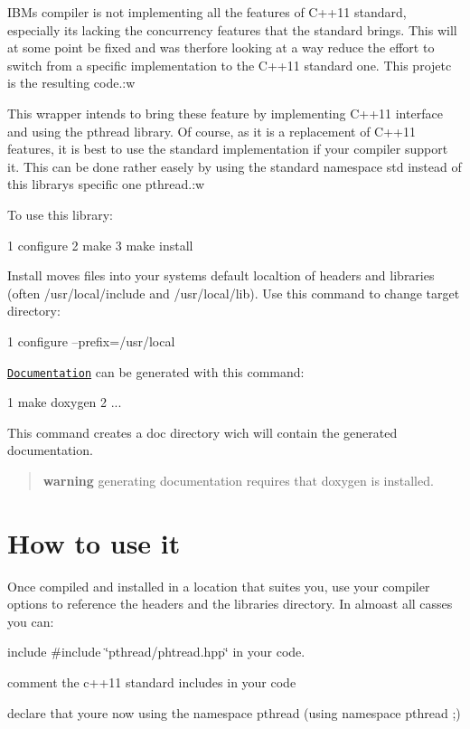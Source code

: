 I\+BM\textquotesingle{}s compiler is not implementing all the features of C++11 standard, especially it\textquotesingle{}s lacking the concurrency features that the standard brings. This will at some point be fixed and was therfore looking at a way reduce the effort to switch from a specific implementation to the C++11 standard one. This projetc is the resulting code.\+:w

This wrapper intends to bring these feature by implementing C++11 interface and using the pthread library. Of course, as it is a replacement of C++11 features, it is best to use the standard implementation if your compiler support it. This can be done rather easely by using the standard namespace {\ttfamily std} instead of this library\textquotesingle{}s specific one {\ttfamily pthread}.\+:w

To use this library\+: 
\begin{DoxyCode}
1 configure
2 make
3 make install
\end{DoxyCode}


Install moves files into your system\textquotesingle{}s default localtion of headers and libraries (often /usr/local/include and /usr/local/lib). Use this command to change target directory\+: 
\begin{DoxyCode}
1 configure --prefix=/usr/local
\end{DoxyCode}


\href{http://herbertkoelman.github.io/cpp-pthread/doc/html/}{\tt Documentation} can be generated with this command\+: 
\begin{DoxyCode}
1 make doxygen
2 ...
\end{DoxyCode}


This command creates a {\ttfamily doc} directory wich will contain the generated documentation.

\begin{quote}
{\bfseries warning} generating documentation requires that doxygen is installed. \end{quote}


\section*{How to use it}

Once compiled and installed in a location that suites you, use your compiler options to reference the headers and the libraries directory. In almoast all casses you can\+:
\begin{DoxyItemize}
\item include {\ttfamily \#include \char`\"{}pthread/phtread.\+hpp\char`\"{}} in your code.
\item comment the c++11 standard includes in your code
\item declare that you\textquotesingle{}re now using the namespace pthread ({\ttfamily using namespace pthread ;})
\end{DoxyItemize}

